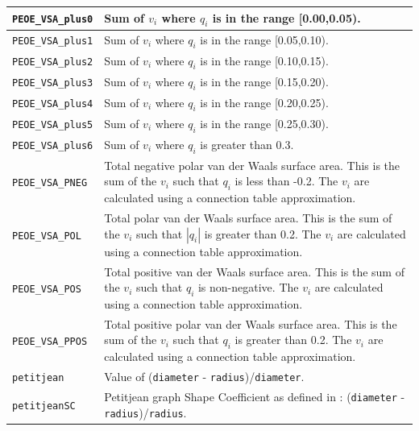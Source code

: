 \documentclass[12pt,a4paper]{article}
\begin{document}
\begin{longtable}{@{\zz}|p{}|p{}|}
\texttt{PEOE\_VSA\_plus0} & Sum of $v_i$ where $q_i$ is in the range 
[0.00,0.05).\\ \hline

\texttt{PEOE\_VSA\_plus1} & Sum of $v_i$ where $q_i$ is in the range 
[0.05,0.10).\\ \hline

\texttt{PEOE\_VSA\_plus2} & Sum of $v_i$ where $q_i$ is in the range 
[0.10,0.15).\\ \hline

\texttt{PEOE\_VSA\_plus3} & Sum of $v_i$ where $q_i$ is in the range 
[0.15,0.20).\\ \hline

\texttt{PEOE\_VSA\_plus4} & Sum of $v_i$ where $q_i$ is in the range 
[0.20,0.25).\\ \hline

\texttt{PEOE\_VSA\_plus5} & Sum of $v_i$ where $q_i$ is in the range 
[0.25,0.30).\\ \hline

\texttt{PEOE\_VSA\_plus6} & Sum of $v_i$ where $q_i$ is greater than 0.3.\\ 
\hline

\texttt{PEOE\_VSA\_PNEG} & Total negative polar van der Waals surface 
area. This is the sum of the $v_i$ such that $q_i$ is less than -0.2. 
The $v_i$ are calculated using a connection table approximation.\\ \hline

\texttt{PEOE\_VSA\_POL} & Total polar van der Waals surface area. This 
is the sum of the $v_i$ such that $|q_i|$ is greater than 0.2. The $v_i$ 
are calculated using a connection table approximation.\\ \hline

\texttt{PEOE\_VSA\_POS} & Total positive van der Waals surface area. 
This is the sum of the $v_i$ such that $q_i$ is non-negative. The 
$v_i$ are calculated using a connection table approximation.\\ \hline

\texttt{PEOE\_VSA\_PPOS} & Total positive polar van der Waals surface 
area. This is the sum of the $v_i$ such that $q_i$ is greater than 
0.2. The $v_i$ are calculated using a connection table approximation.\\ \hline

\texttt{petitjean} & Value of (\texttt{diameter} - 
\texttt{radius})/\texttt{diameter}.\\ \hline

\texttt{petitjeanSC} & Petitjean graph Shape Coefficient as defined in 
\cite{Petitjean1992}: (\texttt{diameter} - \texttt{radius})/\texttt{radius}.\\ 
\hline


\end{longtable}
\end{document}
